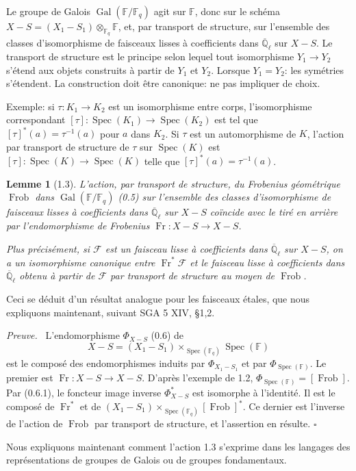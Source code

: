 \documentclass[10pt]{article}
\newcommand{\Fq}{\mathbb F_q}
\newcommand{\Fb}{\mathbb F}
\newcommand{\Ql}{\overline{\mathbb Q}_{\ell}}
\newcommand{\Gal}{\operatorname{Gal}}
\newcommand{\Spec}{\operatorname{Spec}}
\newcommand{\Fr}{\operatorname{Fr}}
\newcommand{\Frob}{\operatorname{Frob}}
\theoremstyle{deligne}
\newtheorem*{lemma*}{Lemme}
\newenvironment{proofdel}[1][Preuve.]{\textit{#1}\ }{\hfill$\square$}
\newcommand{\heading}[1]{\vspace{0.7em}\noindent{\bfseries #1}\quad}
\begin{document}
\heading{1.2.} Le groupe de Galois $\Gal(\Fb/\Fq)$ agit sur $\Fb$, donc sur le schéma $X-S=(X_1-S_1)\otimes_{\Fq}\Fb$, et, par transport de structure, sur l'ensemble des classes d'isomorphisme de faisceaux lisses à coefficients dans $\Ql$ sur $X-S$. Le transport de structure est le principe selon lequel tout isomorphisme $Y_1\to Y_2$ s'étend aux objets construits à partir de $Y_1$ et $Y_2$. Lorsque $Y_1=Y_2$: les symétries s'étendent. La construction doit être canonique: ne pas impliquer de choix.

Exemple: si $\tau:K_1\to K_2$ est un isomorphisme entre corps, l'isomorphisme correspondant $[\tau]:\Spec(K_1)\to\Spec(K_2)$ est tel que $[\tau]^*(a)=\tau^{-1}(a)$ pour $a$ dans $K_2$. Si $\tau$ est un automorphisme de $K$, l'action par transport de structure de $\tau$ sur $\Spec(K)$ est $[\tau]:\Spec(K)\to\Spec(K)$ telle que $[\tau]^*(a)=\tau^{-1}(a)$.

\begin{lemma*}[1.3]
L'action, par transport de structure, du Frobenius géométrique $\Frob$ dans $\Gal(\Fb/\Fq)$ (0.5) sur l'ensemble des classes d'isomorphisme de faisceaux lisses à coefficients dans $\Ql$ sur $X-S$ coïncide avec le tiré en arrière par l'endomorphisme de Frobenius $\Fr:X-S\to X-S$.

Plus précisément, si $\mathcal F$ est un faisceau lisse à coefficients dans $\Ql$ sur $X-S$, on a un isomorphisme canonique entre $\Fr^*\mathcal F$ et le faisceau lisse à coefficients dans $\Ql$ obtenu à partir de $\mathcal F$ par transport de structure au moyen de $\Frob$.
\end{lemma*}

Ceci se déduit d'un résultat analogue pour les faisceaux \'{e}tales, que nous expliquons maintenant, suivant SGA 5 XIV, \S1,2.

\begin{proofdel}
L'endomorphisme $\Phi_{X-S}$ (0.6) de
\[
 X-S=(X_1-S_1)\times_{\Spec(\Fq)}\Spec(\Fb)
\]
est le composé des endomorphismes induits par $\Phi_{X_1-S_1}$ et par $\Phi_{\Spec(\Fb)}$. Le premier est $\Fr:X-S\to X-S$. D'après l'exemple de 1.2, $\Phi_{\Spec(\Fb)}=[\Frob]$. Par (0.6.1), le foncteur image inverse $\Phi^*_{X-S}$ est isomorphe à l'identité. Il est le composé de $\Fr^*$ et de $(X_1-S_1)\times_{\Spec(\Fq)}[\Frob]^*$. Ce dernier est l'inverse de l'action de $\Frob$ par transport de structure, et l'assertion en résulte.
\end{proofdel}

\heading{1.4.} Nous expliquons maintenant comment l'action 1.3 s'exprime dans les langages des représentations de groupes de Galois ou de groupes fondamentaux.
\end{document}
